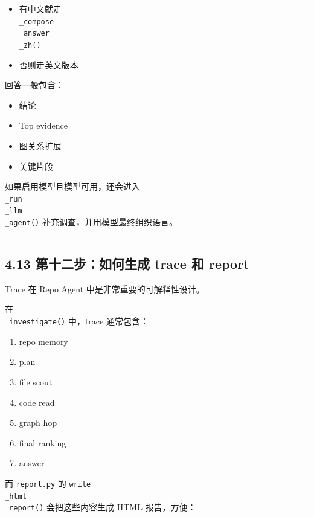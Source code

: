 \documentclass[UTF8,12pt,openany]{ctexbook}
\begin{document}
\begin{itemize}
\item 有中文就走 \texttt{\\_compose\\_answer\\_zh()}
\item 否则走英文版本
\end{itemize}

回答一般包含：\par

\begin{itemize}
\item 结论
\item Top evidence
\item 图关系扩展
\item 关键片段
\end{itemize}

如果启用模型且模型可用，还会进入 \texttt{\\_run\\_llm\\_agent()} 补充调查，并用模型最终组织语言。\par

\hrule

\subsection{4.13 第十二步：如何生成 trace 和 report}

Trace 在 Repo Agent 中是非常重要的可解释性设计。\par

在 \texttt{\\_investigate()} 中，trace 通常包含：\par

\begin{enumerate}
\item repo memory
\item plan
\item file scout
\item code read
\item graph hop
\item final ranking
\item answer
\end{enumerate}

而 \texttt{report.py} 的 \texttt{write\\_html\\_report()} 会把这些内容生成 HTML 报告，方便：\par
\end{document}
